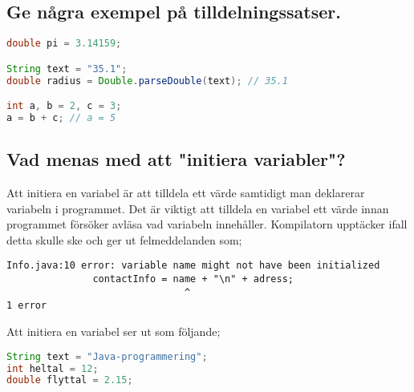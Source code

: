 \documentclass[../main.tex]{subfiles}
\begin{document}
\subsection{Ge några exempel på tilldelningssatser.}

\begin{lstlisting}[language=java]
double pi = 3.14159;

String text = "35.1";
double radius = Double.parseDouble(text); // 35.1

int a, b = 2, c = 3;
a = b + c; // a = 5
\end{lstlisting}

\subsection{Vad menas med att "initiera variabler"?}
Att initiera en variabel är att tilldela ett värde samtidigt man deklarerar variabeln i programmet. Det är viktigt att tilldela en variabel ett värde innan programmet försöker avläsa vad variabeln innehåller. Kompilatorn upptäcker ifall detta skulle ske och ger ut felmeddelanden som;
\begin{lstlisting}
Info.java:10 error: variable name might not have been initialized
               contactInfo = name + "\n" + adress;
                               ^
1 error
\end{lstlisting}
Att initiera en variabel ser ut som följande;

\begin{lstlisting}[language=java]
String text = "Java-programmering";
int heltal = 12;
double flyttal = 2.15;
\end{lstlisting}
\end{document}

